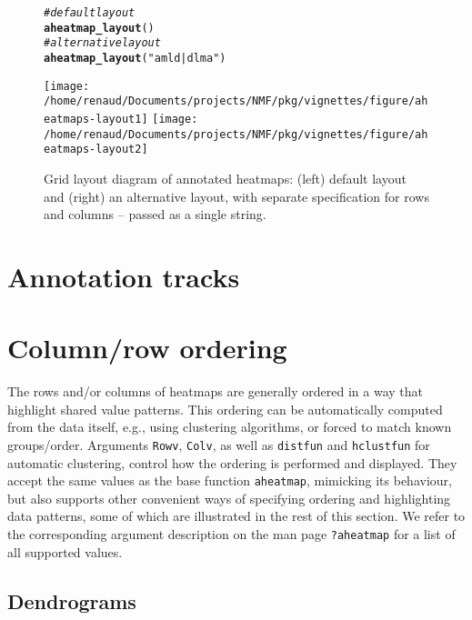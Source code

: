 \documentclass[a4paper]{article}\usepackage[]{graphicx}\usepackage[]{color}
\makeatletter
\newcommand{\hlstr}[1]{\textcolor[rgb]{0.192,0.494,0.8}{#1}}%
\newcommand{\hlcom}[1]{\textcolor[rgb]{0.678,0.584,0.686}{\textit{#1}}}%
\newcommand{\hlstd}[1]{\textcolor[rgb]{0.345,0.345,0.345}{#1}}%
\newcommand{\hlkwd}[1]{\textcolor[rgb]{0.737,0.353,0.396}{\textbf{#1}}}%
\newenvironment{kframe}{%
 \def\at@end@of@kframe{}%
 \ifinner\ifhmode%
  \def\at@end@of@kframe{\end{minipage}}%
  \begin{minipage}{\columnwidth}%
 \fi\fi%
 \def\FrameCommand##1{\hskip\@totalleftmargin \hskip-\fboxsep
 \colorbox{shadecolor}{##1}\hskip-\fboxsep
     \hskip-\linewidth \hskip-\@totalleftmargin \hskip\columnwidth}%
 \MakeFramed {\advance\hsize-\width
   \@totalleftmargin\z@ \linewidth\hsize
   \@setminipage}}%
 {\par\unskip\endMakeFramed%
 \at@end@of@kframe}
\newenvironment{knitrout}{}{} %
\let\code=\texttt
\makeatother
\begin{document}
\begin{figure}[!htpb]
\begin{knitrout}\small
{}\color{fgcolor}\begin{kframe}
\begin{alltt}
\hlcom{# default layout}
\hlkwd{aheatmap_layout}\hlstd{()}
\hlcom{# alternative layout}
\hlkwd{aheatmap_layout}\hlstd{(}\hlstr{"amld | dlma"}\hlstd{)}
\end{alltt}
\end{kframe}
\texttt{[image: /home/renaud/Documents/projects/NMF/pkg/vignettes/figure/aheatmaps-layout1]} 
\texttt{[image: /home/renaud/Documents/projects/NMF/pkg/vignettes/figure/aheatmaps-layout2]} 

\end{knitrout}
\caption{Grid layout diagram of annotated heatmaps: (left) default layout and
(right) an alternative layout, with separate specification for rows
and columns -- passed as a single string.}
\label{fig:layout}
\end{figure}

\section{Annotation tracks}

\section{Column/row ordering}

The rows and/or columns of heatmaps are generally ordered in a way that
highlight shared value patterns.
This ordering can be automatically computed from the data itself, e.g., using
clustering algorithms, or forced to match known groups/order.
Arguments \code{Rowv}, \code{Colv}, as well as \code{distfun} and
\code{hclustfun} for automatic clustering, control how the ordering is
performed and displayed.
They accept the same values as the base function \code{aheatmap}, mimicking its
behaviour, but also supports other convenient ways of specifying ordering and
highlighting data patterns, some of which are illustrated in the rest of this
section.
We refer to the corresponding argument description on the man page
\code{?aheatmap} for a list of all supported values.

\subsection{Dendrograms}
\end{document}
